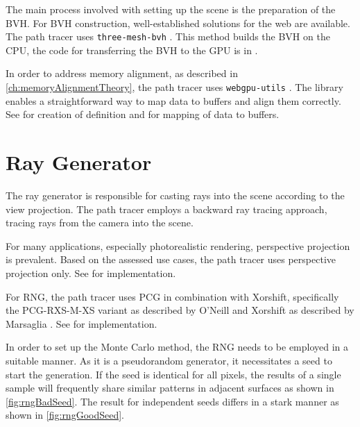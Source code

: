 The main process involved with setting up the scene is the preparation of the \gls{BVH}. For \gls{BVH} construction, well-established solutions for the web are available. The path tracer uses \texttt{three-mesh-bvh} \cite{threeMeshBvh}. This method builds the \gls{BVH} on the \gls{CPU}, the code for transferring the \gls{BVH} to the \gls{GPU} is in .

In order to address memory alignment, as described in \autoref{ch:memoryAlignmentTheory}, the path tracer uses \texttt{webgpu-utils} \cite{webgpuUtilsLib}. The library enables a straightforward way to map data to buffers and align them correctly. See  for creation of definition and  for mapping of data to buffers.


\section{Ray Generator}

The ray generator is responsible for casting rays into the scene according to the view projection. The path tracer employs a backward ray tracing approach, tracing rays from the camera into the scene.

For many applications, especially photorealistic rendering, perspective projection is prevalent. Based on the assessed use cases, the path tracer uses perspective projection only. See  for implementation.

For \gls{RNG}, the path tracer uses \gls{PCG} in combination with Xorshift, specifically the PCG-RXS-M-XS variant as described by O’Neill \cite{o2014pcg} and Xorshift as described by Marsaglia \cite{marsaglia2003xorshift}. See  for implementation.

In order to set up the Monte Carlo method, the \gls{RNG} needs to be employed in a suitable manner. As it is a pseudorandom generator, it necessitates a seed to start the generation. If the seed is identical for all pixels, the results of a single sample will frequently share similar patterns in adjacent surfaces as shown in \autoref{fig:rngBadSeed}. The result for independent seeds differs in a stark manner as shown in \autoref{fig:rngGoodSeed}.

